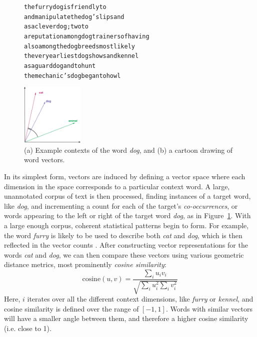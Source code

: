 \documentclass[12pt]{article}
\begin{document}
\begin{figure}
\centering
\begin{minipage}{7cm}
\begin{scriptsize}
\begin{alltt}
         the furry {dog} is friendly to
and manipulate the {dog} 's lips and
       as a clever {dog} ; two to
a reputation among {dog} trainers of having
    also among the {dog} breeds most likely
 the very earliest {dog} shows and kennel
        as a guard {dog} and to hunt
   the mechanic 's {dog} began to howl
\end{alltt}
\end{scriptsize}
\end{minipage}\qquad
\begin{minipage}{3cm}
\includegraphics[width=3cm]{figures/vsm}
\end{minipage}
\caption{(a) Example contexts of the word {\em dog}, and (b) a cartoon drawing
of word vectors.}
\label{fig:vsm}
\end{figure}

In its simplest form, vectors are induced by defining a vector space where
each dimension in the space corresponds to a particular context word. A large,
unannotated corpus of text is then processed, finding instances of a target word,
like {\em dog}, and incrementing a count for each of the target's {\em
co-occurrences}, or words appearing to the left or right of the target word
{\em dog}, as in Figure~\ref{fig:vsm}. With a large enough corpus, coherent
statistical patterns begin to form. For example, the word {\em furry} is likely
to be used to describe both {\em cat} and {\em dog}, which is then reflected in
the vector counts \cite{lund:1996:brmic}. After constructing vector
representations for the words {\em cat} and {\em dog}, we can then compare
these vectors using various geometric distance metrics, most prominently {\em
cosine similarity}:
\begin{equation}
  \text{cosine}(u, v) = \frac{\sum_i u_iv_i}{\sqrt{\sum_i u_i^2 \sum_i v_i^2}}
  \label{eq:cos}
\end{equation}
Here, $i$ iterates over all the different context dimensions, like {\em furry}
or {\em kennel}, and cosine similarity is defined over the range of $[-1, 1]$.
Words with similar vectors will have a smaller angle between them, and therefore
a higher cosine similarity (i.e. close to 1).
\end{document}
